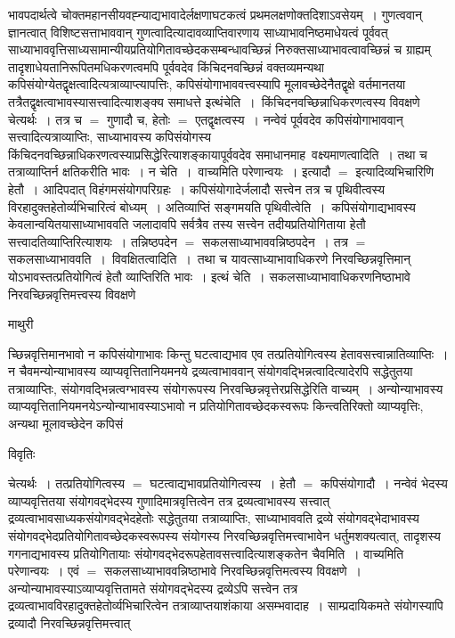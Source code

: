 \documentclass[10pt, openany]{book}
\begin{document}
{भावपदार्थत्वे चोक्तमहानसीयवह्न्याद्यभावादेर्लक्षणाघटकत्वं प्रथमलक्षणोक्तदिशाऽवसेयम्~। गुणत्ववान् ज्ञानत्वात् विशिष्टसत्ताभाववान् गुणत्वादित्यादावव्याप्तिवारणाय साध्याभावनिष्ठमाधेयत्वं पूर्ववत् साध्याभाववृत्तिसाध्यसामान्यीयप्रतियोगितावच्छेदकसम्बन्धावच्छिन्नं निरुक्तसाध्याभावत्वावच्छिन्नं च ग्राह्यम् तादृशाधेयतानिरूपितमधिकरणत्वमपि पूर्ववदेव किंचिदनवच्छिन्नं वक्तव्यमन्यथा कपिसंयोग्येतद्वृक्षत्वादित्यत्राव्याप्त्यापत्तिः, कपिसंयोगाभाववत्त्वस्यापि
मूलावच्छेदेनैतद्वृक्षे वर्तमानतया तत्रैतद्वृक्षत्वाभावस्यासत्त्वादित्याशङ्क्य समाधत्ते {\la इत्थंचेति~।}~किंचिदनवच्छिन्नाधिकरणत्वस्य विवक्षणे चेत्यर्थः~। तत्र च $=$ गुणादौ च, हेतोः $=$ एतद्वृक्षत्वस्य~। नन्वेवं पूर्ववदेव कपिसंयोगाभाववान् सत्त्वादित्यत्राव्याप्तिः, साध्याभावस्य कपिसंयोगस्य
किंचिदनवच्छिन्नाधिकरणत्वस्याप्रसिद्धेरित्याशङ्कायापूर्ववदेव समाधानमाह~वक्ष्यमाणत्वादिति~। तथा च तत्राव्याप्तिर्न क्षतिकरीति भावः~। {\la न चेति~।}~वाच्यमिति परेणान्वयः~। इत्यादौ $=$ इत्यादिव्यभिचारिणि हेतौ~। आदिपदात् विहंगमसंयोगपरिग्रहः~। कपिसंयोगादेर्जलादौ सत्त्वेन तत्र च पृथिवीत्वस्य विरहादुक्तहेतोर्व्यभिचारित्वं बोध्यम्~। अतिव्याप्तिं सङ्गमयति {\qt पृथिवीत्वेति~।}~कपिसंयोगाद्यभावस्य केवलान्वयितयासाध्याभाववति जलादावपि सर्वत्रैव तस्य सत्त्वेन तदीयप्रतियोगिताया हेतौ सत्त्वादतिव्याप्तिरित्याशयः~। तन्निष्ठपदेन $=$ सकलसाध्याभाववन्निष्ठपदेन~। तत्र $=$ सकलसाध्याभाववति~।~{\la विवक्षितत्वादिति~।}~तथा च यावत्साध्याभावाधिकरणे निरवच्छिन्नवृत्तिमान् योऽभावस्तत्प्रतियोगित्वं हेतौ व्याप्तिरिति भावः~। इत्थं चेति~। सकलसाध्याभावाधिकरणनिष्ठाभावे निरवच्छिन्नवृत्तिमत्त्वस्य विवक्षणे
\newpage
 \begin{center}  माथुरी  \end{center} 
{\la च्छिन्नवृत्तिमानभावो न कपिसंयोगाभावः किन्तु घटत्वाद्यभाव एव तत्प्रतियोगित्वस्य हेतावसत्त्वान्नातिव्याप्तिः~। न चैवमन्योन्याभावस्य व्याप्यवृत्तितानियमनये द्रव्यत्वाभाववान् संयोगवद्भिन्नत्वादित्यादेरपि सद्धेतुतया तत्राव्याप्तिः, संयोगवद्भिन्नत्वग्भावस्य संयोगरूपस्य निरवच्छिन्नवृत्तेरप्रसिद्धेरिति वाच्यम्~। अन्योन्याभावस्य व्याप्यवृत्तितानियमनयेऽन्योन्याभावस्याऽभावो न प्रतियोगितावच्छेदकस्वरूपः किन्त्वतिरिक्तो व्याप्यवृत्तिः, अन्यथा मूलावच्छेदेन कपिसं}
\begin{center}     विवृतिः \end{center}
चेत्यर्थः~। तत्प्रतियोगित्वस्य $=$ घटत्वाद्यभावप्रतियोगित्वस्य~। हेतौ  $=$ कपिसंयोगादौ~। नन्वेवं भेदस्य व्याप्यवृत्तितया संयोगवद्भेदस्य गुणादिमात्रवृत्तित्वेन तत्र द्रव्यत्वाभावस्य सत्त्वात् द्रव्यत्वाभावसाध्यकसंयोगवद्भेदहेतोः सद्धेतुतया तत्राव्याप्तिः, साध्याभाववति द्रव्ये संयोगवद्भेदाभावस्य संयोगवद्भेदप्रतियोगितावच्छेदकस्वरूपस्य संयोगस्य निरवच्छिन्नवृत्तिमत्त्वाभावेन धर्तुमशक्यत्वात्, तादृशस्य गगनाद्यभावस्य प्रतियोगितायाः संयोगवद्भेदरूपहेतावसत्त्वादित्याशङ्कतेन {\la चैवमिति~।} वाच्यमिति परेणान्वयः~। एवं $=$ सकलसाध्याभाववन्निष्ठाभावे निरवच्छिन्नवृत्तिमत्वस्य विवक्षणे~। अन्योन्याभावस्याऽव्याप्यवृत्तितामते संयोगवद्भेदस्य द्रव्येऽपि सत्त्वेन तत्र द्रव्यत्वाभावविरहादुक्तहेतोर्व्यभिचारित्वेन तत्राव्याप्तयाशंकाया असम्भवादाह~। साम्प्रदायिकमते संयोगस्यापि द्रव्यादौ निरवच्छिन्नवृत्तिमत्त्वात्
}
\end{document}

